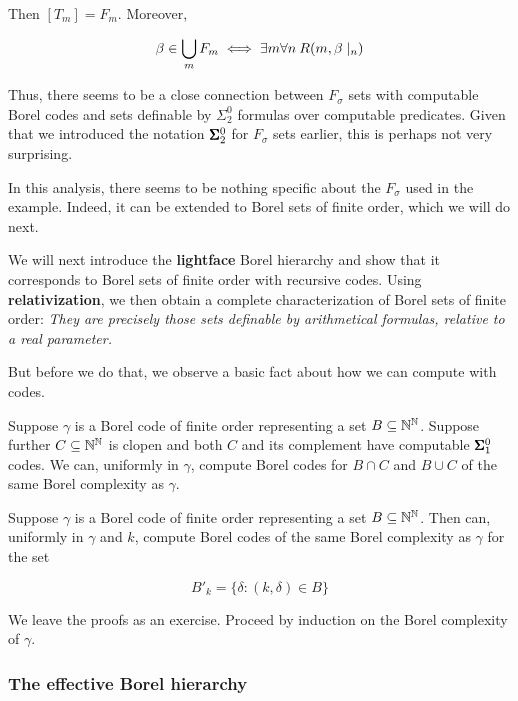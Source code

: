 Then $[T_m] = F_m$. Moreover,

\begin{equation}
\beta \in \bigcup_m F_m \iff \exists m \forall n \: R(m,\beta\mid_{n})
\end{equation}

Thus, there seems to be a close connection between $F_\sigma$ sets with computable Borel codes and sets definable by $\Sigma^0_2$ formulas over computable predicates. Given that we introduced the notation $\pmb{\Sigma}^0_2$ for $F_\sigma$ sets earlier, this is perhaps not very surprising.

In this analysis, there seems to be nothing specific about the $F_\sigma$ used in the example. Indeed, it can be extended to Borel sets of finite order, which we will do next.

We will next introduce the
\textbf{lightface} Borel hierarchy and show that it corresponds to Borel sets of finite order with recursive codes. Using \textbf{relativization}, we then obtain a complete characterization of Borel sets of finite order: \textit{They are precisely those sets definable by arithmetical formulas, relative to a real parameter.}

But before we do that, we observe a basic fact about how we can compute with codes.

\begin{lemma}\label{lem-borel-codes-clopen}Suppose $\gamma$ is a Borel code of finite order representing a set $B \subseteq \mathbb{N}^{\mathbb{N}}$. Suppose further $C \subseteq \mathbb{N}^{\mathbb{N}}$ is clopen and both $C$ and its complement have computable $\pmb{\Sigma}^0_1$ codes. We can, uniformly in $\gamma$, compute Borel codes for $B \cap C$ and $B \cup C$ of the same Borel complexity as $\gamma$.

\end{lemma}\begin{lemma}\label{lem-borel-codes-shift}Suppose $\gamma$ is a Borel code of finite order representing a set $B \subseteq \mathbb{N}^{\mathbb{N}}$. Then can, uniformly in $\gamma$ and $k$, compute Borel codes of the same Borel complexity as $\gamma$ for the set

\begin{equation}
B'_k = \{ \delta \colon (k, \delta) \in B\}
\end{equation}

\end{lemma}We leave the proofs as an exercise. Proceed by induction on the Borel complexity of $\gamma$.

\subsubsection{The effective Borel hierarchy}

